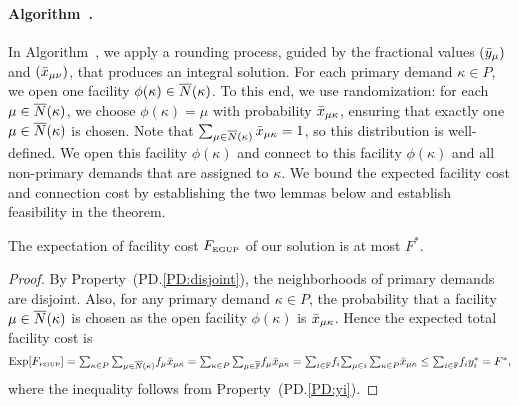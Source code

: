 \documentclass{llncs}
\begin{document}
\paragraph{Algorithm~{\EGUP.}}  In Algorithm~{\EGUP}, we apply a rounding
process, guided by the fractional values $({\bar y}_{\mu})$ and
$({\bar x}_{\mu\nu})$, that produces an integral solution.  For each
primary demand $\kappa\in P$, we open one facility $\phi(\kappa) \in
{\overline{N}}(\kappa)$. To this end, we use randomization: for each
$\mu\in{\overline{N}}(\kappa)$, we choose $\phi(\kappa) = \mu$ with
probability ${\bar x}_{\mu\kappa}$, ensuring that exactly one $\mu \in
{\overline{N}}(\kappa)$ is chosen. Note that
$\sum_{\mu\in{\overline{N}}(\kappa)}{\bar x}_{\mu\kappa}=1$, so this distribution
is well-defined.  We open this facility $\phi(\kappa)$ and connect to
this facility $\phi(\kappa)$ and all non-primary demands that are
assigned to $\kappa$.
We bound the expected facility cost and connection cost by
establishing the two lemmas below and establish feasibility in the
theorem.
\begin{lemma}\label{lemma:3fac}
  The expectation of facility cost $F_{\mbox{\tiny\rm EGUP}}$ of our solution is
  at most $F^\ast$.
\end{lemma}

\begin{proof}
  By Property~(PD.\ref{PD:disjoint}), the neighborhoods of primary
  demands are disjoint. Also, for any primary demand $\kappa\in P$,
  the probability that a facility $\mu\in{\overline{N}}(\kappa)$ is chosen as
  the open facility $\phi(\kappa)$ is ${\bar x}_{\mu\kappa}$. Hence the
  expected total facility cost is
%
\begin{equation*}
    \mbox{\rm Exp}[F_{\mbox{\tiny\rm EGUP}}]
	= \textstyle{\sum_{\kappa\in P}\sum_{\mu\in{\overline{N}}(\kappa)}} f_{\mu} {\bar x}_{\mu\kappa}
	= \textstyle{\sum_{\kappa\in P}\sum_{\mu\in\overline{\mathbb{F}}}} f_{\mu} {\bar x}_{\mu\kappa} 
	= \textstyle{\sum_{i\in\mathbb{F}}} f_i \textstyle{\sum_{\mu\in i}\sum_{\kappa\in P}} {\bar x}_{\mu\kappa} 
	\leq \textstyle{\sum_{i\in\mathbb{F}}} f_i y_i^\ast 
	= F^\ast,
\end{equation*}
%
where the inequality follows from Property~(PD.\ref{PD:yi}).
\end{proof}
\end{document}
